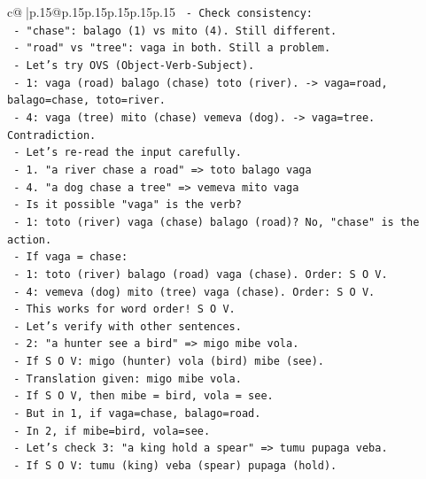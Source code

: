\documentclass{article}
\begin{document}
{\begin{supertabular}{c@{$\;$}|p{.15\linewidth}@{}p{.15\linewidth}p{.15\linewidth}p{.15\linewidth}p{.15\linewidth}p{.15\linewidth}}
{{{\texttt{          {-} Check consistency:} \\
\texttt{            {-} "chase": balago (1) vs mito (4). Still different.} \\
\texttt{            {-} "road" vs "tree": vaga in both. Still a problem.} \\
\texttt{        {-} Let's try OVS (Object{-}Verb{-}Subject).} \\
\texttt{          {-} 1: vaga (road) balago (chase) toto (river). {-}> vaga=road, balago=chase, toto=river.} \\
\texttt{          {-} 4: vaga (tree) mito (chase) vemeva (dog). {-}> vaga=tree. Contradiction.} \\
\texttt{        {-} Let's re{-}read the input carefully.} \\
\texttt{          {-} 1. "a river chase a road" => toto balago vaga} \\
\texttt{          {-} 4. "a dog chase a tree" => vemeva mito vaga} \\
\texttt{        {-} Is it possible "vaga" is the verb?} \\
\texttt{          {-} 1: toto (river) vaga (chase) balago (road)? No, "chase" is the action.} \\
\texttt{          {-} If vaga = chase:} \\
\texttt{            {-} 1: toto (river) balago (road) vaga (chase). Order: S O V.} \\
\texttt{            {-} 4: vemeva (dog) mito (tree) vaga (chase). Order: S O V.} \\
\texttt{            {-} This works for word order! S O V.} \\
\texttt{            {-} Let's verify with other sentences.} \\
\texttt{            {-} 2: "a hunter see a bird" => migo mibe vola.} \\
\texttt{              {-} If S O V: migo (hunter) vola (bird) mibe (see).} \\
\texttt{              {-} Translation given: migo mibe vola.} \\
\texttt{              {-} If S O V, then mibe = bird, vola = see.} \\
\texttt{              {-} But in 1, if vaga=chase, balago=road.} \\
\texttt{              {-} In 2, if mibe=bird, vola=see.} \\
\texttt{              {-} Let's check 3: "a king hold a spear" => tumu pupaga veba.} \\
\texttt{              {-} If S O V: tumu (king) veba (spear) pupaga (hold).} \\
}}}
\end{supertabular}}
\end{document}
